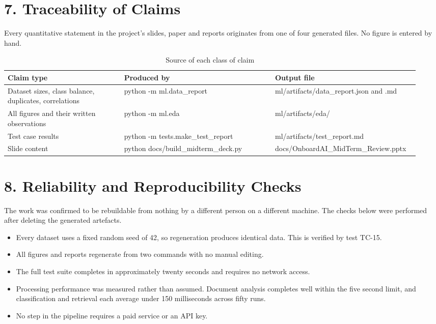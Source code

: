 \documentclass[11pt,a4paper]{article}
\begin{document}
\section{7. Traceability of Claims}
Every quantitative statement in the project's slides, paper and reports originates from one of four generated files. No figure is entered by hand.

\begin{table}[!t]
\centering
\caption{Source of each class of claim}
\small
\setlength{\tabcolsep}{3pt}
\begin{tabular}{p{0.272\linewidth}p{0.355\linewidth}p{0.313\linewidth}}
\toprule
\textbf{Claim type} & \textbf{Produced by} & \textbf{Output file} \\
\midrule
Dataset sizes, class balance, duplicates, correlations & python -m ml.data\_report & ml/artifacts/data\_report.json and .md \\
All figures and their written observations & python -m ml.eda & ml/artifacts/eda/ \\
Test case results & python -m tests.make\_test\_report & ml/artifacts/test\_report.md \\
Slide content & python docs/build\_midterm\_deck.py & docs/OnboardAI\_MidTerm\_Review.pptx \\
\bottomrule
\end{tabular}
\end{table}

\section{8. Reliability and Reproducibility Checks}
The work was confirmed to be rebuildable from nothing by a different person on a different machine. The checks below were performed after deleting the generated artefacts.

\begin{itemize}[leftmargin=*,itemsep=2pt]
  \item Every dataset uses a fixed random seed of 42, so regeneration produces identical data. This is verified by test TC-15.
  \item All figures and reports regenerate from two commands with no manual editing.
  \item The full test suite completes in approximately twenty seconds and requires no network access.
  \item Processing performance was measured rather than assumed. Document analysis completes well within the five second limit, and classification and retrieval each average under 150 milliseconds across fifty runs.
  \item No step in the pipeline requires a paid service or an API key.
\end{itemize}
\end{document}
